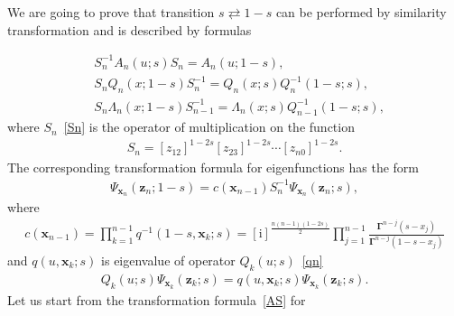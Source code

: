 \documentclass[10pt,a4paper]{amsart}
\renewcommand{\imath}{\mathrm{i}}
\numberwithin{equation}{section}
\begin{document}
We are going to prove that transition $s \rightleftarrows 1-s$
can be performed by similarity transformation and is described by formulas

\begin{align}\label{AS}
&S^{-1}_n A_n(u;s) S_n = A_n(u;1-s) , \\
\nonumber
&S_n Q_n(x;1-s) S^{-1}_{n} = Q_n(x;s) Q^{-1}_{n}(1-s;s) , \\
\label{SL}
&S_n \Lambda_n(x;1-s) S^{-1}_{n-1} =
\Lambda_n(x;s) Q^{-1}_{n-1}(1-s;s) ,
\end{align}
where $S_n$~\eqref{Sn} is the operator of multiplication on
the function
\begin{align*}
S_n = [z_{12}]^{1-2s} [z_{23}]^{1-2s}
\cdots [z_{n0}]^{1-2s} .
\end{align*}
The corresponding transformation formula for eigenfunctions has the form
\begin{align*}
\Psi_{\bm x_n}(\bm z_n;1-s) = c(\bm x_{n-1})
S^{-1}_n \Psi_{\bm x_n}(\bm z_n;s) ,
\end{align*}
where
\begin{align}\label{cx}
c(\bm x_{n-1}) =
\prod_{k=1}^{n-1} q^{-1}(1-s ,\bm x_{k};s) =
 [\imath]^{\frac{n(n-1)(1-2s)}{2}}
\prod_{j=1}^{n-1}\frac{\mathbf{\Gamma}^{n-j}(s-x_j)}
{\mathbf{\Gamma}^{n-j}(1-s-x_j)}
\end{align}
and $q(u ,\bm x_{k};s)$ is eigenvalue
of operator $Q_k(u;s)$~\eqref{qn}
\begin{align*}
Q_k(u;s) \Psi_{\bm x_k}(\bm z_k;s)
= q(u ,\bm x_{k};s) \Psi_{\bm x_k}(\bm z_k;s) .
\end{align*}
Let us start from the transformation formula~\eqref{AS} for
\end{document}
